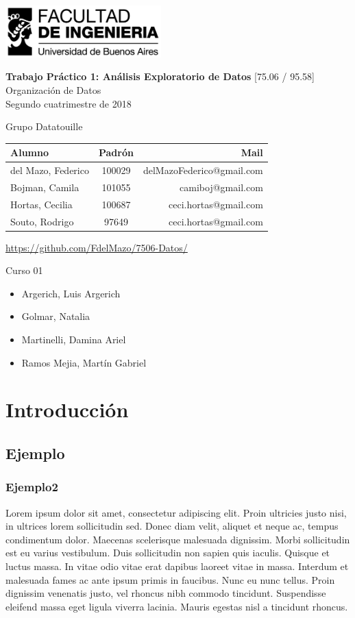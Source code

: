 \documentclass[a4paper]{article}
\makeatletter
\newcommand{\materia}{[75.06 / 95.58] Organización de Datos}
\newcommand{\trabajo}{Trabajo Práctico 1: Análisis Exploratorio de Datos}
\newcommand{\cuatrimestre}{Segundo cuatrimestre de 2018}
\newcommand{\grupo}{Grupo Datatouille}
\newcommand{\repo}{https://github.com/FdelMazo/7506-Datos/}
\newcommand{\alumnos}{
    del Mazo, Federico & 100029 & delMazoFederico@gmail.com\\
    Bojman, Camila & 101055 &  camiboj@gmail.com\\
    Hortas, Cecilia & 100687 & ceci.hortas@gmail.com\\
    Souto, Rodrigo & 97649 & ceci.hortas@gmail.com\\
}
\newcommand{\curso}{Curso 01}
\newcommand{\docentes}{
    \item Argerich, Luis Argerich
    \item Golmar, Natalia
    \item Martinelli, Damina Ariel
    \item Ramos Mejia, Martín Gabriel
}
\makeatother
\begin{document}
\begin{titlepage}
	\hfill\includegraphics[width=6cm]{fiuba.jpg}
    \begin{center}
    \vfill
    \Huge \textbf{\trabajo}
    \vskip2cm
    \Large \materia\\
    \cuatrimestre
    \vfill
    \begin{flushleft} 
    \grupo
    \end{flushleft}
    \begin{tabular}{|l|c|r|}
	\hline
	Alumno & Padrón & Mail\\
	\hline \hline
    \alumnos
	\hline
	\end{tabular}
    \begin{flushleft} 
    \url{\repo}
    \end{flushleft}
    \vskip1cm
    \end{center}
    \curso
    \begin{itemize}
        \docentes
    \end{itemize}
\end{titlepage}

\tableofcontents
\newpage
{}
\setcounter{page}{1}

\section{Introducción}
\subsection{Ejemplo}
\subsubsection{Ejemplo2}

 Lorem ipsum dolor sit amet, consectetur adipiscing elit. Proin ultricies justo nisi, in ultrices lorem sollicitudin sed. Donec diam velit, aliquet et neque ac, tempus condimentum dolor. Maecenas scelerisque malesuada dignissim. Morbi sollicitudin est eu varius vestibulum. Duis sollicitudin non sapien quis iaculis. Quisque et luctus massa. In vitae odio vitae erat dapibus laoreet vitae in massa. Interdum et malesuada fames ac ante ipsum primis in faucibus. Nunc eu nunc tellus. Proin dignissim venenatis justo, vel rhoncus nibh commodo tincidunt. Suspendisse eleifend massa eget ligula viverra lacinia. Mauris egestas nisl a tincidunt rhoncus. 
\end{document}
